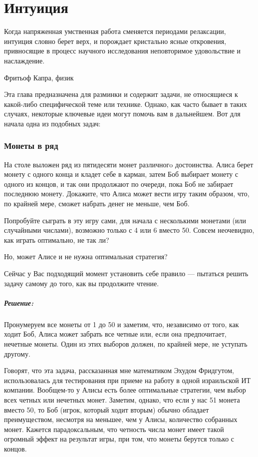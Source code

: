 \chapter*{Интуиция}
                                         

\epigraph{Когда напряженная
умственная  работа  сменяется  периодами  релаксации,  интуиция
словно  берет  верх,  и  порождает кристально ясные откровения,
привносящие  в  процесс  научного   исследования   неповторимое
удовольствие и наслаждение.}{Фритьоф Капра, физик}

Эта глава предназначена для разминки и  содержит задачи, не относящиеся к какой-либо специфической теме или технике. Однако, как часто бывает в таких случаях, некоторые  ключевые идеи могут помочь вам в дальнейшем.  Вот для начала одна из подобных задач:




\subsection*{Монеты в ряд} %


На столе выложен ряд из пятидесяти монет различногo достоинства. Алиса берет монету с одного конца и кладет себе в карман, затем Боб выбирает монету с одного из концов, и так они продолжают по очереди, пока Боб не забирает последнюю монету.
 Докажите, что Алиса может вести игру таким образом, что, по крайней мере, сможет набрать денег не меньше, чем Боб.


Попробуйте сыграть в эту игру сами, для начала с несколькими монетами (или случайными числами), возможно только с 4 или 6 вместо 50. 
Совсем неочевидно, как играть оптимально, не так ли?


Но, может Алисе и не нужна оптимальная стратегия? 


Сейчас у Вас подходящий момент установить себе правило --- пытаться решить задачу самому до того, как вы продолжите чтение.


\paragraph{Решение:}
Пронумеруем все монеты от 1 до 50 и заметим, что, независимо от того, как ходит Боб, Алиса может забрать все четные или, если она предпочитает, нечетные монеты.
Один из этих выборов должен, по крайней мере, не уступать другому.


Говорят, что эта задача, рассказанная мне математиком  Эхудом Фридгутом, использовалась для тестирования при приеме на работу в одной израильской ИТ компании. 
Вообщем-то у Алисы есть более оптимальные стратегии, чем выбор всех четных или нечетных монет.
Заметим, однако, что если у нас 51 монета вместо 50, то Боб (игрок, который ходит вторым) обычно обладает преимуществом, несмотря на меньшее, чем у Алисы, количество собранных монет.  
Кажется парадоксальным, что четность числа монет имеет такой огромный эффект на результат игры, при том, что монеты берутся только с концов.



